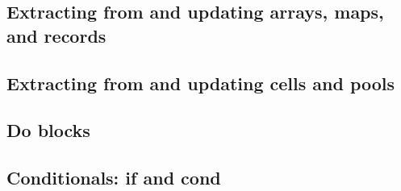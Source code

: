 \documentclass{article}
\theoremstyle{definition}
\begin{document}

\hypertarget{hsec:attr-form}{}
\subsection{Extracting from and updating arrays, maps, and records}
\label{sec:attr-form}



\hypertarget{hsec:cell-pool-forms}{}
\subsection{Extracting from and updating cells and pools}
\label{sec:cell-pool-forms}



\hypertarget{hsec:doblocks}{}
\subsection{Do blocks}
\label{sec:doblocks}


\hypertarget{hsec:conditionals}{}
\subsection{Conditionals: if and cond}
\label{sec:conditionals}
\end{document}
